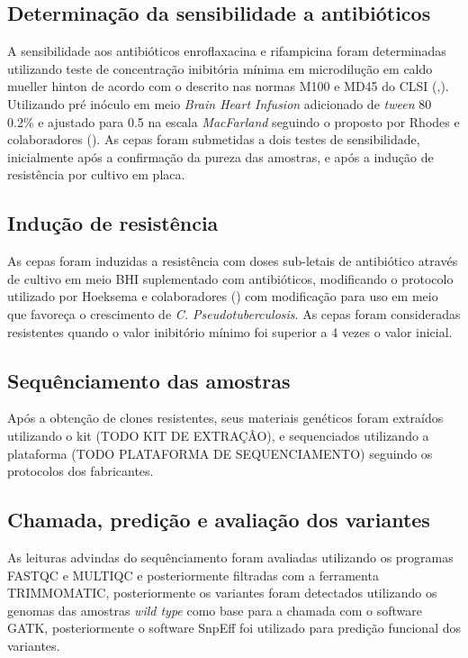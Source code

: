 \subsection{Determinação da sensibilidade a antibióticos}

A sensibilidade aos antibióticos enroflaxacina e rifampicina foram determinadas utilizando teste de concentração inibitória mínima em microdilução em 
caldo mueller hinton de acordo com o descrito nas
normas M100 e MD45 do CLSI (\citeyear{clsi2015},\citeyear{clsi2020}). Utilizando pré inóculo em meio \textit{Brain Heart Infusion} adicionado de \textit{tween} 80 0.2\%
e ajustado para 0.5 na escala \textit{MacFarland} seguindo o proposto por Rhodes e colaboradores (\citeyear{rhodes2015}).
As cepas foram submetidas a dois testes de sensibilidade, inicialmente após a confirmação da pureza das amostras, e após a indução de resistência por cultivo em placa.


\subsection{Indução de resistência}

As cepas foram induzidas a resistência com doses sub-letais de antibiótico através de cultivo em meio BHI suplementado com antibióticos,
modificando o protocolo utilizado por Hoeksema e colaboradores (\citeyear{hoeksema2019}) com modificação para uso em meio que favoreça o crescimento de \textit{C. Pseudotuberculosis}. 
As cepas foram consideradas resistentes quando o valor inibitório mínimo foi superior a 4 vezes o valor inicial.


\subsection{Sequênciamento das amostras}

Após a obtenção de clones resistentes, seus materiais genéticos foram extraídos utilizando o kit (TODO KIT DE EXTRAÇÂO), e sequenciados utilizando a plataforma (TODO PLATAFORMA DE SEQUENCIAMENTO) seguindo os protocolos dos fabricantes.

\subsection{Chamada, predição e avaliação dos variantes}

As leituras advindas do sequênciamento foram avaliadas utilizando os programas FASTQC e MULTIQC e posteriormente filtradas com a ferramenta TRIMMOMATIC, posteriormente
os variantes foram detectados utilizando os genomas das amostras \textit{wild type} como base para a chamada com o software GATK, posteriormente o software SnpEff foi utilizado para predição funcional dos variantes. 

